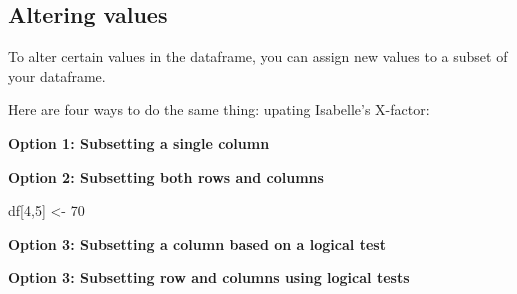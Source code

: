 \documentclass[]{book}
\newenvironment{Shaded}{\begin{snugshade}}{\end{snugshade}}
\newcommand{\DecValTok}[1]{\textcolor[rgb]{0.00,0.00,0.81}{#1}}
\newcommand{\KeywordTok}[1]{\textcolor[rgb]{0.13,0.29,0.53}{\textbf{#1}}}
\newcommand{\NormalTok}[1]{#1}
\newcommand{\OperatorTok}[1]{\textcolor[rgb]{0.81,0.36,0.00}{\textbf{#1}}}
\newcommand{\StringTok}[1]{\textcolor[rgb]{0.31,0.60,0.02}{#1}}
\begin{document}
\hypertarget{altering-values}{%
\subsection*{Altering values}\label{altering-values}}

To alter certain values in the dataframe, you can assign new values to a subset of your dataframe.

Here are four ways to do the same thing: upating Isabelle's X-factor:

\textbf{Option 1: Subsetting a single column}

\begin{Shaded}
\end{Shaded}

\textbf{Option 2: Subsetting both rows and columns}

\begin{Shaded}
\begin{Highlighting}[]
\NormalTok{df[}\DecValTok{4}\NormalTok{,}\DecValTok{5}\NormalTok{] <-}\StringTok{ }\DecValTok{70}
\end{Highlighting}
\end{Shaded}

\textbf{Option 3: Subsetting a column based on a logical test}

\begin{Shaded}
\end{Shaded}

\textbf{Option 3: Subsetting row and columns using logical tests}

\begin{Shaded}
\end{Shaded}
\end{document}
